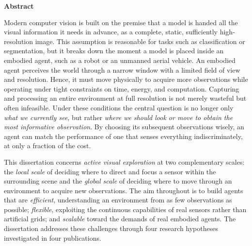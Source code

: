 \clearpage
\begin{center}
    {\large\bfseries Abstract}
\end{center}
\vspace{1em}

Modern computer vision is built on the premise that a model is handed all the visual information it needs in advance, as a complete, static, sufficiently high-resolution image. This assumption is reasonable for tasks such as classification or segmentation, but it breaks down the moment a model is placed inside an embodied agent, such as a robot or an unmanned aerial vehicle. An embodied agent perceives the world through a narrow window with a limited field of view and resolution. Hence, it must move physically to acquire more observations while operating under tight constraints on time, energy, and computation. Capturing and processing an entire environment at full resolution is not merely wasteful but often infeasible. Under these conditions the central question is no longer only \emph{what we currently see}, but rather \emph{where we should look or move to obtain the most informative observation}. By choosing its subsequent observations wisely, an agent can match the performance of one that senses everything indiscriminately, at only a fraction of the cost.

This dissertation concerns \emph{active visual exploration} at two complementary scales: the \emph{local scale} of deciding where to direct and focus a sensor within the surrounding scene and the \emph{global scale} of deciding where to move through an environment to acquire new observations. The aim throughout is to build agents that are \emph{efficient}, understanding an environment from as few observations as possible; \emph{flexible}, exploiting the continuous capabilities of real sensors rather than artificial grids; and \emph{scalable} toward the demands of real embodied agents. The dissertation addresses these challenges through four research hypotheses investigated in four publications.

